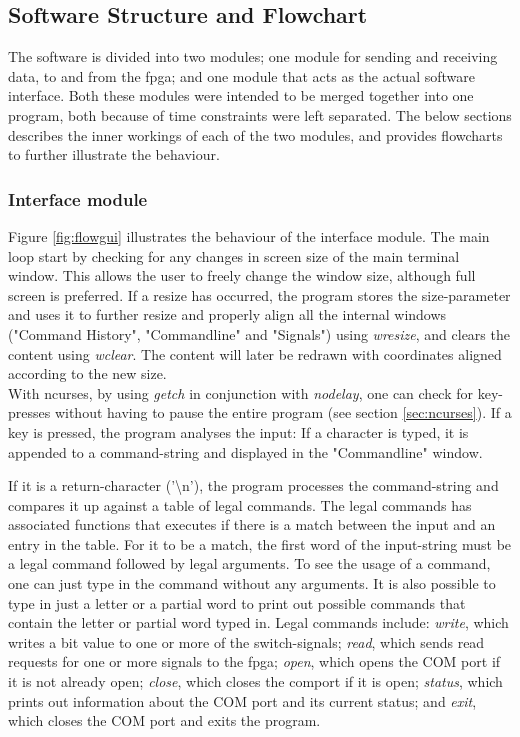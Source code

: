 \documentclass[main.tex]{subfiles}
\begin{document}
\subsection{Software Structure and Flowchart}

The software is divided into two modules; one module for sending and receiving data, to and from the \gls{fpga}; and one module that acts as the actual software interface. Both these modules were intended to be merged together into one program, both because of time constraints were left separated. The below sections describes the inner workings of each of the two modules, and provides flowcharts to further illustrate the behaviour.

\subsubsection{Interface module}
Figure \ref{fig:flowgui} illustrates the behaviour of the interface module. The main loop start by checking for any changes in screen size of the main terminal window. This allows the user to freely change the window size, although full screen is preferred. If a resize has occurred, the program stores the size-parameter and uses it to further resize and properly align all the internal windows ("Command History", "Commandline" and "Signals") using \textit{wresize}, and clears the content using \textit{wclear}. The content will later be redrawn with coordinates aligned according to the new size.\\

With ncurses, by using \textit{getch} in conjunction with \textit{nodelay}, one can check for key-presses without having to pause the entire program (see section \ref{sec:ncurses}). If a key is pressed, the program analyses the input: If a character is typed, it is appended to a command-string and displayed in the "Commandline" window. 

If it is a return-character ('\textbackslash n'), the program processes the command-string and compares it up against a table of legal commands. The legal commands has associated functions that executes if there is a match between the input and an entry in the table. For it to be a match, the first word of the input-string must be a legal command followed by legal arguments. To see the usage of a command, one can just type in the command without any arguments. It is also possible to type in just a letter or a partial word to print out possible commands that contain the letter or partial word typed in. Legal commands include: \textit{write}, which writes a bit value to one or more of the switch-signals; \textit{read}, which sends read requests for one or more signals to the \gls{fpga}; \textit{open}, which opens the COM port if it is not already open; \textit{close}, which closes the comport if it is open; \textit{status}, which prints out information about the COM port and its current status; and \textit{exit}, which closes the COM port and exits the program.
\end{document}
